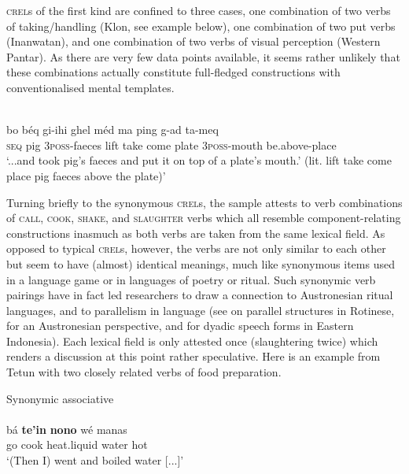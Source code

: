 \textsc{crel}s of the first kind are confined to three cases, one combination of two verbs of taking/handling (Klon, see example below), one combination of two put verbs (Inanwatan), and one combination of two verbs of visual perception (Western Pantar). As there are very few data points available, it seems rather unlikely that these combinations actually constitute full-fledged constructions with conventionalised mental templates.

\ea \label{}
\\
\gll bo béq gi-ihi ghel méd ma ping g-ad ta-meq \\
\textsc{seq} pig \textsc{3}\textsc{poss}-faeces lift take come plate \textsc{3}\textsc{poss}-mouth be.above-place \\
\glft `...and took pig's faeces and put it on top of a plate's mouth.' (lit. lift take come place pig faeces above the plate)'\\ 
\z

Turning briefly to the synonymous \textsc{crel}s, the sample attests to verb combinations of \textsc{call}, \textsc{cook}, \textsc{shake}, and \textsc{slaughter} verbs which all resemble component-relating constructions inasmuch as both verbs are taken from the same lexical field. As opposed to typical \textsc{crel}s, however, the verbs are not only similar to each other but seem to have (almost) identical meanings, much like synonymous items used in a language game or in languages of poetry or ritual. Such synonymic verb pairings have in fact led researchers to draw a connection to Austronesian ritual languages, and to parallelism in language (see \citealt{fox1971semantic} on parallel structures in Rotinese, \citealt{fox2005ritual} for an Austronesian perspective, and \citealt{fox2006speak} for dyadic speech forms in Eastern Indonesia). Each lexical field is only attested once (slaughtering twice) which renders a discussion at this point rather speculative. Here is an example from Tetun with two closely related verbs of food preparation.

\ea Synonymic associative \label{} \\
\\
\gll bá \textbf{te'in} \textbf{nono} wé manas \\
go cook heat.liquid water hot \\
\glft `(Then I) went and boiled water [...]'\\ 
\z

